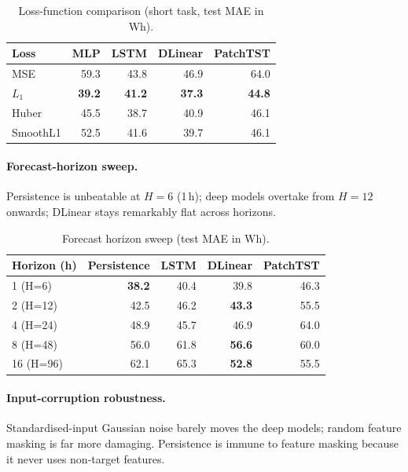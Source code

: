 \documentclass{article}
\begin{document}
\begin{table}[h]
\centering
\small
\caption{Loss-function comparison (short task, test MAE in Wh).}
\label{tab:loss}
\begin{tabular}{lrrrr}
\toprule
Loss & MLP & LSTM & DLinear & PatchTST \\
\midrule
MSE      & 59.3          & 43.8          & 46.9          & 64.0 \\
$L_1$    & \textbf{39.2} & \textbf{41.2} & \textbf{37.3} & \textbf{44.8} \\
Huber    & 45.5          & 38.7          & 40.9          & 46.1 \\
SmoothL1 & 52.5          & 41.6          & 39.7          & 46.1 \\
\bottomrule
\end{tabular}
\end{table}

\paragraph{Forecast-horizon sweep.}
Persistence is unbeatable at $H{=}6$ (1\,h); deep models overtake
from $H{=}12$ onwards; DLinear stays remarkably flat across horizons.

\begin{table}[h]
\centering
\small
\caption{Forecast horizon sweep (test MAE in Wh).}
\label{tab:hor}
\begin{tabular}{lrrrr}
\toprule
Horizon (h) & Persistence & LSTM & DLinear & PatchTST \\
\midrule
1 (H=6)   & \textbf{38.2} & 40.4 & 39.8          & 46.3 \\
2 (H=12)  & 42.5          & 46.2 & \textbf{43.3} & 55.5 \\
4 (H=24)  & 48.9          & 45.7 & 46.9          & 64.0 \\
8 (H=48)  & 56.0          & 61.8 & \textbf{56.6} & 60.0 \\
16 (H=96) & 62.1          & 65.3 & \textbf{52.8} & 55.5 \\
\bottomrule
\end{tabular}
\end{table}

\paragraph{Input-corruption robustness.}
Standardised-input Gaussian noise barely moves the deep models;
random feature masking is far more damaging. Persistence is immune
to feature masking because it never uses non-target features.
\end{document}
